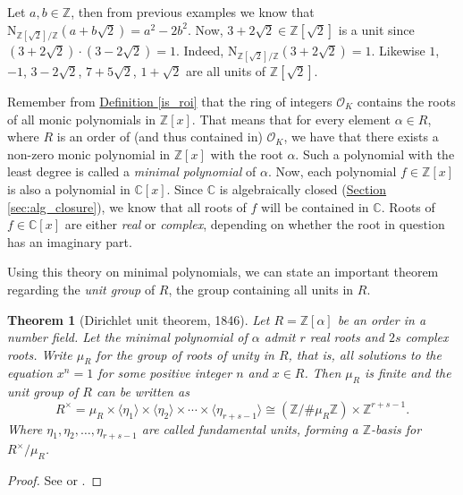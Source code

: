 \documentclass[openany, a4paper, 10pt]{book}
\theoremstyle{plain}
\newtheorem{theorem}{Theorem}[chapter]
\theoremstyle{plain}
\theoremstyle{plain}
\theoremstyle{definition}
\theoremstyle{plain}
\theoremstyle{definition}
\theoremstyle{remark}
\newcommand{\defref}[1]{\hyperref[#1]{Definition \ref{#1}}}
\newcommand{\secref}[1]{\hyperref[#1]{Section \ref{#1}}}
\begin{document}
\begin{examplebox}
    Let $a,b \in \mathbb Z$, then from previous examples we know that
    $\mathrm{N}_{\mathbb Z[\sqrt{2}]/\mathbb Z} (a+b\sqrt{2}) = a^2-2b^2$.
    Now, $3+2\sqrt{2} \in \mathbb Z[\sqrt{2}]$ is a unit since $(3+2\sqrt{2})\cdot (3 - 2\sqrt{2}) = 1$.
    Indeed, $\mathrm{N}_{\mathbb Z[\sqrt{2}]/\mathbb Z}(3+2\sqrt{2}) = 1$.
    Likewise $1$, $-1$, $3-2\sqrt{2}$, $7+5\sqrt{2}$, $1+\sqrt{2}$ are all units of $\mathbb Z[\sqrt{2}]$.
\end{examplebox}

Remember from \defref{is_roi} that the ring of integers $\mathcal O_K$ contains the roots of all monic polynomials in $\mathbb Z[x]$.
That means that for every element $\alpha \in R$, where $R$ is an order of (and thus contained in) $\mathcal O_K$, we have that there exists a non-zero monic polynomial in $\mathbb Z[x]$ with the root $\alpha$.
Such a polynomial with the least degree is called a \textit{minimal polynomial} of $\alpha$.
Now, each polynomial $f \in \mathbb Z[x]$ is also a polynomial in $\mathbb C[x]$.
Since $\mathbb C$ is algebraically closed (\secref{sec:alg_closure}), we know that all roots of $f$ will be contained in $\mathbb C$.
Roots of $f\in \mathbb C[x]$ are either \textit{real} or \textit{complex}, depending on whether the root in question has an imaginary part.

Using this theory on minimal polynomials, we can state an important theorem regarding the \textit{unit group} of $R$, the group containing all units in $R$.


\begin{theorem}[Dirichlet unit theorem, 1846]\label{unit_theorem}
    Let $R=\mathbb Z[\alpha]$ be an order in a number field.
    Let the minimal polynomial of $\alpha$ admit $r$ real roots and $2s$ complex roots.
    Write $\mu_R$ for the group of roots of unity in $R$, that is, all solutions to the equation $x^n=1$ for some positive integer $n$ and $x \in R$.
    Then $\mu_R$ is finite
    and the unit group of $R$ can be written as
    $$R^\times = \mu_R \times \langle \eta_1 \rangle \times \langle \eta_2 \rangle \times \cdots \times \langle \eta_{r+s-1} \rangle \cong (\mathbb Z / \#\mu_R\mathbb Z)\times \mathbb Z^{r+s-1}.$$
    Where $\eta_1, \eta_2, \dots, \eta_{r+s-1}$ are called \emph{fundamental units}, forming a $\mathbb Z$-basis for $R^\times / \mu_R$.
\end{theorem}
\begin{proof}
    See \cite{dirichlet} or \cite[Section~6.2]{dirichlet2}.
\end{proof}
\end{document}
